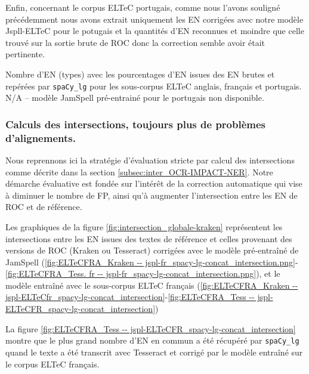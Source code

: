 Enfin, concernant le corpus ELTeC portugais, comme nous l'avons souligné précédemment nous avons extrait uniquement les EN corrigées avec notre modèle Jspll-ELTeC pour le potugais et la quantités d'EN reconnues et moindre que celle trouvé sur la sortie brute de ROC donc la correction semble avoir était pertinente.
\begin{table}[h!]
    \centering
    \small
    
    \caption{Nombre d'EN (types) avec les pourcentages d'EN issues des EN brutes et repérées par \texttt{spaCy\_lg} pour les sous-corpus ELTeC anglais, français et portugais. N/A -- modèle JamSpell pré-entrainé pour le portugais non disponible.}
    \label{tab:ELTeC}
\end{table}

\subsubsection{Calculs des intersections, toujours plus de problèmes d'alignements. }

Nous reprennons ici la stratégie d'évaluation stricte par calcul des intersections comme décrite dans la section \ref{subsec:inter_OCR-IMPACT-NER}.
Notre démarche évaluative est fondée sur l'intérêt de la correction automatique qui vise à diminuer le nombre de FP, ainsi qu'à augmenter l'intersection entre les EN de ROC et de référence. 

Les graphiques de la figure \ref{fig:intersection_globale-kraken} représentent les intersections entre les EN issues des textes de référence et celles provenant des versions de ROC (Kraken ou Tesseract) corrigées avec le modèle pré-entraîné de JamSpell (\ref{fig:ELTeCFRA_Kraken -- jspl-fr_spacy-lg-concat_intersection.png}-\ref{fig:ELTeCFRA_Tess. fr -- jspl-fr_spacy-lg-concat_intersection.png}), et le modèle entraîné avec le sous-corpus ELTeC français (\ref{fig:ELTeCFRA_Kraken -- jspl-ELTeCfr_spacy-lg-concat_intersection}-\ref{fig:ELTeCFRA_Tess -- jspl-ELTeCFR_spacy-lg-concat_intersection})

La figure \ref{fig:ELTeCFRA_Tess -- jspl-ELTeCFR_spacy-lg-concat_intersection} montre que le plus grand nombre d'EN en commun a été récupéré par \texttt{spaCy\_lg} quand le texte a été transcrit avec Tesseract et corrigé par le modèle entraîné sur le corpus ELTeC français.


